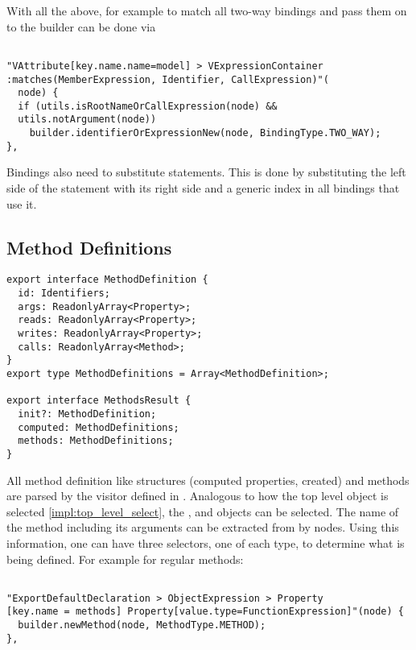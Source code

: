 With all the above, for example to match all two-way bindings and pass them on to the builder can be done via 
\begin{lstlisting}
  
"VAttribute[key.name.name=model] > VExpressionContainer
:matches(MemberExpression, Identifier, CallExpression)"(
  node) {
  if (utils.isRootNameOrCallExpression(node) && 
  utils.notArgument(node))
    builder.identifierOrExpressionNew(node, BindingType.TWO_WAY);
},
\end{lstlisting}


Bindings also need to substitute  statements. This is done by substituting the left side of the  statement with its right side and a generic index in all bindings that use it.

\subsection{Method Definitions}

\begin{lstlisting}
export interface MethodDefinition {
  id: Identifiers;
  args: ReadonlyArray<Property>;
  reads: ReadonlyArray<Property>;
  writes: ReadonlyArray<Property>;
  calls: ReadonlyArray<Method>;
}
export type MethodDefinitions = Array<MethodDefinition>;

export interface MethodsResult {
  init?: MethodDefinition;
  computed: MethodDefinitions;
  methods: MethodDefinitions;
}
\end{lstlisting}
All method definition like structures (computed properties, created) and methods are parsed by the visitor defined in .
Analogous to how the top level  object is selected \ref{impl:top_level_select}, the ,  and  objects can be selected. 
The name of the method including its arguments can be extracted from by  nodes. Using this information, one can have three selectors, one of each type, to determine what is being defined. For example for regular methods:
 
\begin{lstlisting}

"ExportDefaultDeclaration > ObjectExpression > Property
[key.name = methods] Property[value.type=FunctionExpression]"(node) {
  builder.newMethod(node, MethodType.METHOD);
},
\end{lstlisting}

